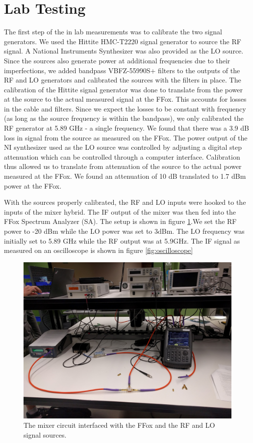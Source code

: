 \documentclass[twocolumn, aps, floatfix]{revtex4-1}
\begin{document}

\section*{Lab Testing}

The first step of the in lab measurements was to calibrate the two signal generators. We used the Hittite HMC-T2220 signal generator to source the RF signal. A National Instruments Synthesizer was also provided as the LO source. Since the sources also generate power at additional frequencies due to their imperfections, we added bandpass VBFZ-55990S+ filters to the outputs of the RF and LO generators and calibrated the sources with the filters in place. The calibration of the Hittite signal generator was done to translate from the power at the source to the actual measured signal at the FFox. This accounts for losses in the cable and filters. Since we expect the losses to be constant with frequency (as long as the source frequency is within the bandpass), we only calibrated the RF generator at 5.89 GHz - a single frequency. We found that there was a 3.9 dB loss in signal from the source as measured on the FFox. The power output of the NI synthesizer used as the LO source was controlled by adjusting a digital step attenuation which can be controlled through a computer interface. Calibration thus allowed us to translate from attenuation of the source to the actual power measured at the FFox. We found an attenuation of 10 dB translated to 1.7 dBm power at the FFox.

With the sources properly calibrated, the RF and LO inputs were hooked to the inputs of the  mixer hybrid. The IF output of the mixer was then fed into the FFox Spectrum Analyzer (SA). The setup is shown in figure \ref{fig:setup}.We set the RF power to -20 dBm while the LO power was set to 3dBm. The LO frequency was initially set to 5.89 GHz while the RF output was at 5.9GHz. The IF signal as measured on an oscilloscope is shown in figure \ref{fig:oscilloscope}
\begin{figure}[!htbp]
    \includegraphics[scale=0.05]{setup.jpg}
    \caption{The mixer circuit interfaced with the FFox and the RF and LO signal sources.}
    \label{fig:setup}
\end{figure}
\end{document}
